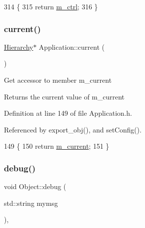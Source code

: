 \begin{DoxyCode}
314                    \{
315     \textcolor{keywordflow}{return} \hyperlink{classApplication_aa371ed989ed34038df400c4d1b41b37f}{m\_ctrl};
316   \}
\end{DoxyCode}
\mbox{\label{classApplication_af25c880ff1e95d863ed058396754a76e}} 
\subsubsection{\texorpdfstring{current()}{current()}}
{\footnotesize\ttfamily \hyperlink{classHierarchy}{Hierarchy}$\ast$ Application\+::current (\begin{DoxyParamCaption}{ }\end{DoxyParamCaption})\hspace{0.3cm}{\ttfamily [inline]}}

Get accessor to member m\+\_\+current \begin{DoxyReturn}{Returns}
the current value of m\+\_\+current 
\end{DoxyReturn}


Definition at line 149 of file Application.\+h.



Referenced by export\+\_\+obj(), and set\+Config().


\begin{DoxyCode}
149                         \{
150     \textcolor{keywordflow}{return} \hyperlink{classApplication_ab0fd877a3c66c41b22109863e1719ccd}{m\_current};
151   \}
\end{DoxyCode}
\mbox{\label{classObject_aac010553f022165573714b7014a15f0d}} 
\subsubsection{\texorpdfstring{debug()}{debug()}\hspace{0.1cm}{\footnotesize\ttfamily [1/2]}}
{\footnotesize\ttfamily void Object\+::debug (\begin{DoxyParamCaption}\item[{std\+::string}]{mymsg }\end{DoxyParamCaption})\hspace{0.3cm}{\ttfamily [inline]}, {\ttfamily [inherited]}}



